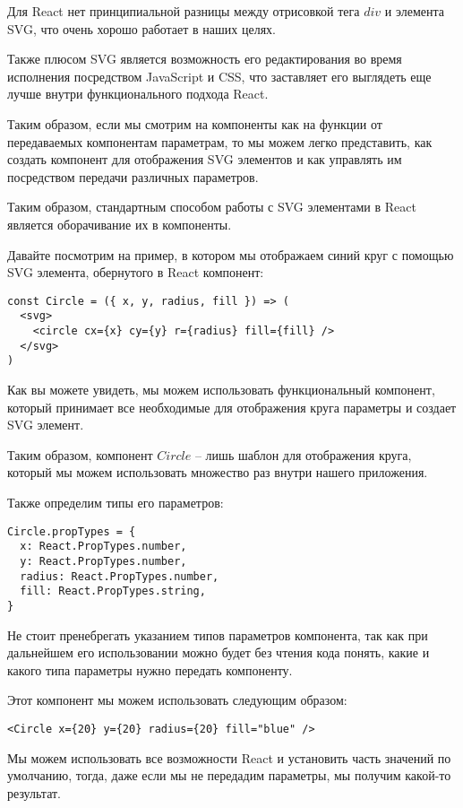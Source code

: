 Для React нет принципиальной разницы между отрисовкой тега $div$ и элемента SVG, что очень хорошо работает в наших целях.

Также плюсом SVG является возможность его редактирования во время исполнения посредством JavaScript и CSS, что заставляет его выглядеть еще лучше внутри функционального подхода React. 

Таким образом, если мы смотрим на компоненты как на функции от передаваемых компонентам параметрам, то мы можем легко представить, как создать компонент для отображения SVG элементов и как управлять им посредством передачи различных параметров.

Таким образом, стандартным способом работы с SVG элементами в React является оборачивание их в компоненты.

Давайте посмотрим на пример, в котором мы отображаем синий круг с помощью SVG элемента, обернутого в React компонент:

\begin{lstlisting}
const Circle = ({ x, y, radius, fill }) => (
  <svg>
    <circle cx={x} cy={y} r={radius} fill={fill} />
  </svg>
)
\end{lstlisting}

Как вы можете увидеть, мы можем использовать функциональный компонент, который принимает все необходимые для отображения круга параметры и создает SVG элемент.

Таким образом, компонент $Circle$ -- лишь шаблон для отображения круга, который мы можем использовать множество раз внутри нашего приложения.

Также определим типы его параметров:

\begin{lstlisting}
Circle.propTypes = {
  x: React.PropTypes.number,
  y: React.PropTypes.number,
  radius: React.PropTypes.number,
  fill: React.PropTypes.string,
}
\end{lstlisting}

Не стоит пренебрегать указанием типов параметров компонента, так как при дальнейшем его использовании можно будет без чтения кода понять, какие и какого типа параметры нужно передать компоненту.

Этот компонент мы можем использовать следующим образом:

\begin{lstlisting}
<Circle x={20} y={20} radius={20} fill="blue" />
\end{lstlisting}

Мы можем использовать все возможности React и установить часть значений по умолчанию, тогда, даже если мы не передадим параметры, мы получим какой-то результат.

